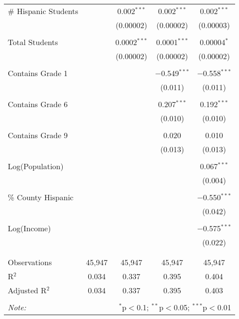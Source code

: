 \begin{table}[!htbp]
\begin{tabular}{@{\extracolsep{-2pt}}lcccc}
 \# Hispanic Students &  & 0.002$^{***}$ & 0.002$^{***}$ & 0.002$^{***}$ \\ 
  &  & (0.00002) & (0.00002) & (0.00003) \\ 
  & & & & \\ 
 Total Students &  & 0.0002$^{***}$ & 0.0001$^{***}$ & 0.00004$^{*}$ \\ 
  &  & (0.00002) & (0.00002) & (0.00002) \\ 
  & & & & \\ 
 Contains Grade 1 &  &  & $-$0.549$^{***}$ & $-$0.558$^{***}$ \\ 
  &  &  & (0.011) & (0.011) \\ 
  & & & & \\ 
 Contains Grade 6 &  &  & 0.207$^{***}$ & 0.192$^{***}$ \\ 
  &  &  & (0.010) & (0.010) \\ 
  & & & & \\ 
 Contains Grade 9 &  &  & 0.020 & 0.010 \\ 
  &  &  & (0.013) & (0.013) \\ 
  & & & & \\ 
 Log(Population) &  &  &  & 0.067$^{***}$ \\ 
  &  &  &  & (0.004) \\ 
  & & & & \\ 
 \% County Hispanic &  &  &  & $-$0.550$^{***}$ \\ 
  &  &  &  & (0.042) \\ 
  & & & & \\ 
 Log(Income) &  &  &  & $-$0.575$^{***}$ \\ 
  &  &  &  & (0.022) \\ 
  & & & & \\ 
\hline \\[-1.8ex] 
Observations & 45,947 & 45,947 & 45,947 & 45,947 \\ 
R$^{2}$ & 0.034 & 0.337 & 0.395 & 0.404 \\ 
Adjusted R$^{2}$ & 0.034 & 0.337 & 0.395 & 0.403 \\ 
\hline 
\hline \\[-1.8ex] 
\textit{Note:}  & \multicolumn{4}{r}{$^{*}$p$<$0.1; $^{**}$p$<$0.05; $^{***}$p$<$0.01} \\ 
\end{tabular} 
\end{table} 
